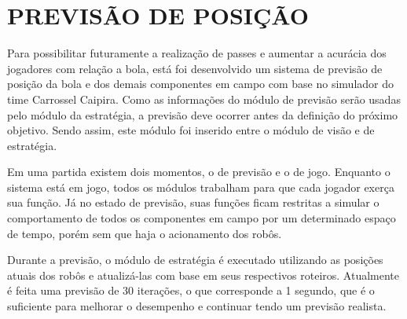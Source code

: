 \section{PREVISÃO DE POSI{\c C}ÃO}

Para possibilitar futuramente a realização de passes e
aumentar a acurácia dos jogadores com relação a bola, está foi
desenvolvido um sistema de previsão de posição da bola e dos demais 
componentes em campo com base no simulador do time Carrossel Caipira.
Como as informações do módulo de previsão serão usadas pelo
módulo da estratégia, a previsão deve ocorrer antes da definição do próximo objetivo. 
Sendo assim, este módulo foi inserido entre o módulo de visão e de estratégia.

Em uma partida existem dois momentos, o de previsão e o de jogo. Enquanto o sistema
está em jogo, todos os módulos trabalham para que cada jogador exerça sua função. Já no
estado de previsão, suas funções ficam restritas a simular o comportamento de todos os
componentes em campo por um determinado espaço de tempo, porém sem que haja o acionamento dos robôs.

Durante a previsão, o módulo de estratégia é executado utilizando as posições 
atuais dos robôs e atualizá-las com base em seus respectivos roteiros. Atualmente é feita uma
previsão de 30 iterações, o que corresponde a 1 segundo, que é o suficiente para melhorar o 
desempenho e continuar tendo um previsão realista.   
